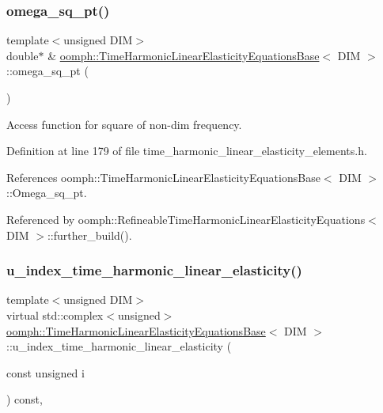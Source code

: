 \subsubsection{\texorpdfstring{omega\+\_\+sq\+\_\+pt()}{omega\_sq\_pt()}}
{\footnotesize\ttfamily template$<$unsigned D\+IM$>$ \\
double$\ast$ \& \hyperlink{classoomph_1_1TimeHarmonicLinearElasticityEquationsBase}{oomph\+::\+Time\+Harmonic\+Linear\+Elasticity\+Equations\+Base}$<$ D\+IM $>$\+::omega\+\_\+sq\+\_\+pt (\begin{DoxyParamCaption}{ }\end{DoxyParamCaption})\hspace{0.3cm}{\ttfamily [inline]}}



Access function for square of non-\/dim frequency. 



Definition at line 179 of file time\+\_\+harmonic\+\_\+linear\+\_\+elasticity\+\_\+elements.\+h.



References oomph\+::\+Time\+Harmonic\+Linear\+Elasticity\+Equations\+Base$<$ D\+I\+M $>$\+::\+Omega\+\_\+sq\+\_\+pt.



Referenced by oomph\+::\+Refineable\+Time\+Harmonic\+Linear\+Elasticity\+Equations$<$ D\+I\+M $>$\+::further\+\_\+build().

\mbox{\label{classoomph_1_1TimeHarmonicLinearElasticityEquationsBase_a847401d5305a393e7c133cd92bd0bb35}} 
\subsubsection{\texorpdfstring{u\+\_\+index\+\_\+time\+\_\+harmonic\+\_\+linear\+\_\+elasticity()}{u\_index\_time\_harmonic\_linear\_elasticity()}}
{\footnotesize\ttfamily template$<$unsigned D\+IM$>$ \\
virtual std\+::complex$<$unsigned$>$ \hyperlink{classoomph_1_1TimeHarmonicLinearElasticityEquationsBase}{oomph\+::\+Time\+Harmonic\+Linear\+Elasticity\+Equations\+Base}$<$ D\+IM $>$\+::u\+\_\+index\+\_\+time\+\_\+harmonic\+\_\+linear\+\_\+elasticity (\begin{DoxyParamCaption}\item[{const unsigned}]{i }\end{DoxyParamCaption}) const\hspace{0.3cm}{\ttfamily [inline]}, {\ttfamily [virtual]}}



